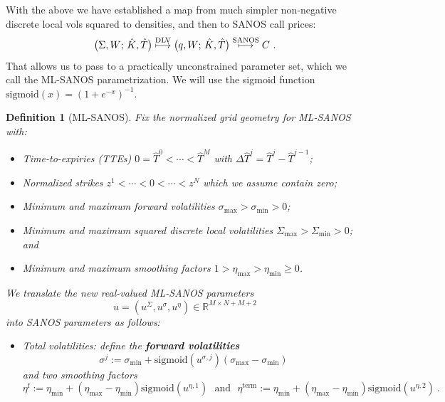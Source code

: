 \documentclass[11pt,a4paper]{article}
\newtheorem{definition}{Definition}[section]
\newcommand{\R}{\mathbb{R}}
\DeclareRobustCommand{\supstack}[2]{\stackrel{\mbox{{\scriptsize ${#1}$}}}{ {#2} }}     %
\DeclareRobustCommand{\eqlabel}[1]{\label{eq:#1}}                                     %
\DeclareRobustCommand{\eq}[1]{\begin{equation}\eqlabel{#1}}                           %
\DeclareRobustCommand{\eqx}{\begin{equation}}                                         %
\DeclareRobustCommand{\eqend}{\end{equation}}                                         %
\begin{document}
With the above we have established a map from much simpler non-negative discrete local vols squared to
densities, and then to SANOS call prices:
\begin{equation}\label{eq:sanosmap2}
    \big( \Sigma, W;\, \hat K,\hat T\big) \supstack{\mathrm{DLV}}\longmapsto
    \big( q, W;\, \hat K,\hat T\big) \supstack{\mathrm{SANOS}}\longmapsto C \ .
\end{equation}
That allows us to pass to a practically unconstrained parameter set, which we call the ML-SANOS parametrization.
We will use the sigmoid function $\mathrm{sigmoid}(x)=(1+e^{-x})^{-1}$.

\begin{definition}[ML-SANOS]\label{def:ml-sanos}
    Fix the normalized grid geometry for ML-SANOS with:
    \begin{itemize}
        \item Time-to-expiries (TTEs) $0=\hat T^0<\cdots<\hat T^M$ with
        $\Delta\hat T^j = \hat T^j-\hat T^{j-1}$;
        \item Normalized strikes $z^1<\cdots<0<\cdots<z^N$ which we assume contain zero;
        \item Minimum and maximum forward volatilities $\sigma_{\max} > \sigma_{\min} > 0$;
        \item Minimum and maximum squared discrete local volatilities $\Sigma_{\max} > \Sigma_{\min} > 0$; and
        \item Minimum and maximum smoothing factors $1> \eta_{\max} > \eta_{\min} \geq 0$.
    \end{itemize}
    We translate the new real-valued \emph{ML-SANOS parameters}
    \eq{production-native-state}
      u=(u^\Sigma,u^\sigma,u^{\eta})    \in\R^{M\times N+M+2}
    \eqend
    into SANOS parameters as follows:
    \begin{itemize}
        \item Total volatilities:
        define the \textbf{forward volatilities}
             \eqx
                    \sigma^j := \sigma_{\min}
               +\mathrm{sigmoid}( u^{\sigma,j} ) ( \sigma_{\max} - \sigma_{\min} )
            \eqend
            and two smoothing factors
            \begin{equation}
                \label{eq:etatrans}
                \eta^{\mathrm f}:=\eta_{\min}
                  +(\eta_{\max}-\eta_{\min})
                    \mathrm{sigmoid}(u^{\eta,1}) \ \ \ \mbox{and} \ \ \
                \eta^{\mathrm{term}}:=\eta_{\min}
                  +(\eta_{\max}-\eta_{\min})
                    \mathrm{sigmoid}(u^{\eta,2}) \ .

\end{equation}
\end{itemize}
\end{definition}
\end{document}
